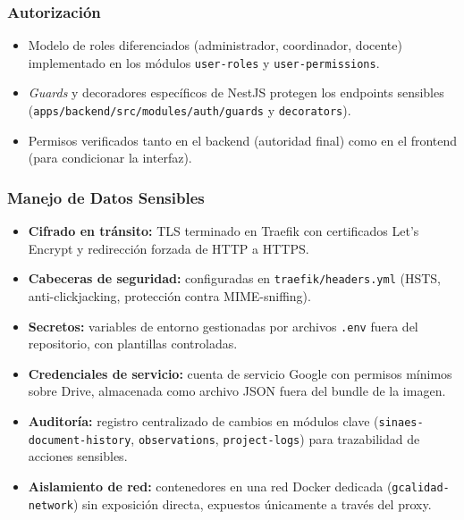 \subsubsection{Autorización}
\begin{itemize}
    \item Modelo de roles diferenciados (administrador, coordinador, docente) implementado en los módulos \texttt{user-roles} y \texttt{user-permissions}.
    \item \emph{Guards} y decoradores específicos de NestJS protegen los endpoints sensibles (\texttt{apps/backend/src/modules/auth/guards} y \texttt{decorators}).
    \item Permisos verificados tanto en el backend (autoridad final) como en el frontend (para condicionar la interfaz).
\end{itemize}

\subsubsection{Manejo de Datos Sensibles}
\begin{itemize}
    \item \textbf{Cifrado en tránsito:} TLS terminado en Traefik con certificados Let's Encrypt y redirección forzada de HTTP a HTTPS.
    \item \textbf{Cabeceras de seguridad:} configuradas en \texttt{traefik/headers.yml} (HSTS, anti-clickjacking, protección contra MIME-sniffing).
    \item \textbf{Secretos:} variables de entorno gestionadas por archivos \texttt{.env} fuera del repositorio, con plantillas controladas.
    \item \textbf{Credenciales de servicio:} cuenta de servicio Google con permisos mínimos sobre Drive, almacenada como archivo JSON fuera del bundle de la imagen.
    \item \textbf{Auditoría:} registro centralizado de cambios en módulos clave (\texttt{sinaes-document-history}, \texttt{observations}, \texttt{project-logs}) para trazabilidad de acciones sensibles.
    \item \textbf{Aislamiento de red:} contenedores en una red Docker dedicada (\texttt{gcalidad-network}) sin exposición directa, expuestos únicamente a través del proxy.
\end{itemize}

